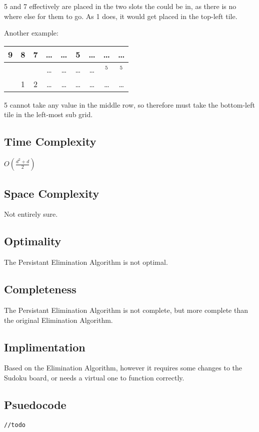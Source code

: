 \documentclass[10pt,letterpaper]{article}
\begin{document}
      5 and 7 effectively are placed in the two slots the could be in, as there is no where else for them to go. As 1 does, it would get placed in the top-left tile.
      
      Another example:
	
      \begin{tabular}{|c|c|c|c|c|c|c|c|c|}
	\hline
	9&8&7&\ldots&\ldots&5&\ldots&\ldots&\ldots\\
	\hline
	  & & &\ldots&\ldots&\ldots&\ldots&\(^5\)&\(^5\)\\
	\hline
	  &1&2&\ldots&\ldots&\ldots&\ldots&\ldots&\ldots\\
	\hline
      \end{tabular}
      
      5 cannot take any value in the middle row, so therefore must take the bottom-left tile in the left-most sub grid.
      
    \subsection{Time Complexity}
      \(O\left(\frac{d^2+d}{2}\right)\)
    
    \subsection{Space Complexity}
      Not entirely sure.
    
    \subsection{Optimality}
      The Persistant Elimination Algorithm is not optimal.
    
    \subsection{Completeness}
      The Persistant Elimination Algorithm is not complete, but more complete than the original Elimination Algorithm.
    
    \subsection{Implimentation}
      Based on the Elimination Algorithm, however it requires some changes to the Sudoku board, or needs a virtual one to function correctly.
    
    \newpage
    \subsection{Psuedocode}
      \begin{verbatim}
//todo
      \end{verbatim}
      
      
\end{document}
